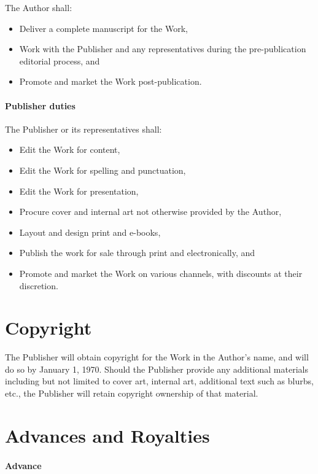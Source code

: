 \documentclass[12pt,letterpaper]{article}
\def\CopyrightDate{January 1, 1970}
\begin{document}
The Author shall:

\begin{itemize}
    \item Deliver a complete manuscript for the Work,
    \item Work with the Publisher and any representatives during the pre-publication editorial process, and
    \item Promote and market the Work post-publication.
\end{itemize}

\paragraph{Publisher duties}

The Publisher or its representatives shall:

\begin{itemize}
    \item Edit the Work for content,
    \item Edit the Work for spelling and punctuation,
    \item Edit the Work for presentation,
    \item Procure cover and internal art not otherwise provided by the Author,
    \item Layout and design print and e-books,
    \item Publish the work for sale through print and electronically, and
    \item Promote and market the Work on various channels, with discounts at their discretion.
\end{itemize}

\section{Copyright}

The Publisher will obtain copyright for the Work in the Author's name, and will do so by \CopyrightDate. Should the Publisher provide any additional materials including but not limited to cover art, internal art, additional text such as blurbs, etc., the Publisher will retain copyright ownership of that material.

\section{Advances and Royalties}

\paragraph{Advance}
\end{document}
